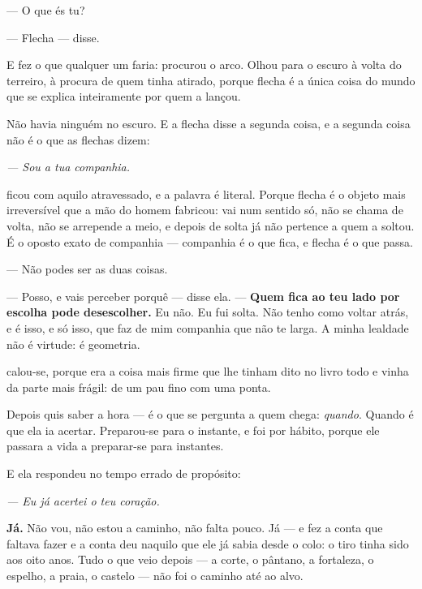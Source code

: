 \documentclass[livro.tex]{subfiles}
\begin{document}
\medskip
\noindent --- O que és tu?

--- Flecha --- disse.

\medskip
\noindent E \Ben fez o que qualquer um faria: procurou o arco. Olhou para o
escuro à volta do terreiro, à procura de quem tinha atirado, porque flecha é a
única coisa do mundo que se explica inteiramente por quem a lançou.

\medskip
\noindent Não havia ninguém no escuro. E a flecha disse a segunda coisa, e a
segunda coisa não é o que as flechas dizem:

\begin{center}
\emph{--- Sou a tua companhia.}
\end{center}

\medskip
\noindent \Ben ficou com aquilo atravessado, e a palavra é literal. Porque
flecha é o objeto mais irreversível que a mão do homem fabricou: vai num
sentido só, não se chama de volta, não se arrepende a meio, e depois de solta já
não pertence a quem a soltou. É o oposto exato de companhia --- companhia é o
que fica, e flecha é o que passa.

\medskip
\noindent --- Não podes ser as duas coisas.

--- Posso, e vais perceber porquê --- disse ela. --- \textbf{Quem fica ao teu
lado por escolha pode desescolher.} Eu não. Eu fui solta. Não tenho como voltar
atrás, e é isso, e só isso, que faz de mim companhia que não te larga. A minha
lealdade não é virtude: é geometria.

\medskip
\noindent \Ben calou-se, porque era a coisa mais firme que lhe tinham dito no
livro todo e vinha da parte mais frágil: de um pau fino com uma ponta.

\medskip
\noindent Depois quis saber a hora --- é o que se pergunta a quem chega:
\emph{quando}. Quando é que ela ia acertar. Preparou-se para o instante, e foi
por hábito, porque ele passara a vida a preparar-se para instantes.

\medskip
\noindent E ela respondeu no tempo errado de propósito:

\begin{center}
\emph{--- Eu já acertei o teu coração.}
\end{center}

\medskip
\noindent \textbf{Já.} Não vou, não estou a caminho, não falta pouco. Já ---
e \Ben fez a conta que faltava fazer e a conta deu naquilo que ele já sabia
desde o colo: o tiro tinha sido aos oito anos. Tudo o que veio depois --- a
corte, o pântano, a fortaleza, o espelho, a praia, o castelo --- não foi o
caminho até ao alvo.
\end{document}
